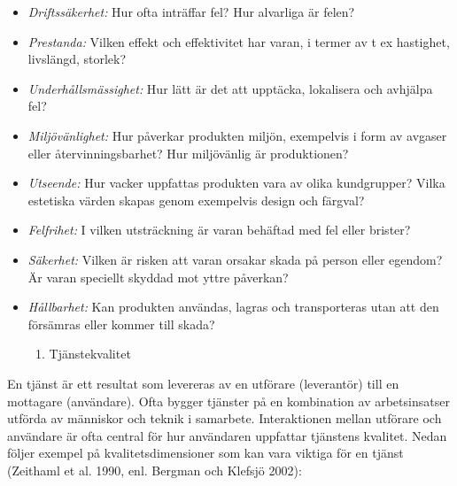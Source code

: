 \begin{itemize}
\item
  \emph{Driftssäkerhet:} Hur ofta inträffar fel? Hur alvarliga är felen?
\item
  \emph{Prestanda:} Vilken effekt och effektivitet har varan, i termer
  av t ex hastighet, livslängd, storlek?
\item
  \emph{Underhållsmässighet:} Hur lätt är det att upptäcka, lokalisera
  och avhjälpa fel?
\item
  \emph{Miljövänlighet:} Hur påverkar produkten miljön, exempelvis i
  form av avgaser eller återvinningsbarhet? Hur miljövänlig är
  produktionen?
\item
  \emph{Utseende:} Hur vacker uppfattas produkten vara av olika
  kundgrupper? Vilka estetiska värden skapas genom exempelvis design och
  färgval?
\item
  \emph{Felfrihet:} I vilken utsträckning är varan behäftad med fel
  eller brister?
\item
  \emph{Säkerhet:} Vilken är risken att varan orsakar skada på person
  eller egendom? Är varan speciellt skyddad mot yttre påverkan?
\item
  \emph{Hållbarhet:} Kan produkten användas, lagras och transporteras
  utan att den försämras eller kommer till skada?

  \begin{enumerate}
  \def\labelenumi{\arabic{enumi}.}
  \item
    Tjänstekvalitet
  \end{enumerate}
\end{itemize}

En tjänst är ett resultat som levereras av en utförare (leverantör) till
en mottagare (användare). Ofta bygger tjänster på en kombination av
arbetsinsatser utförda av människor och teknik i samarbete.
Interaktionen mellan utförare och användare är ofta central för hur
användaren uppfattar tjänstens kvalitet. Nedan följer exempel på
kvalitetsdimensioner som kan vara viktiga för en tjänst (Zeithaml et al.
1990, enl. Bergman och Klefsjö 2002):

